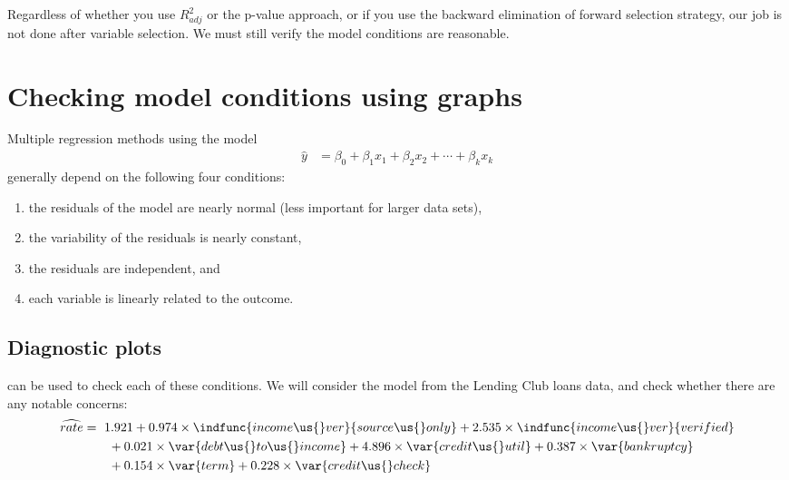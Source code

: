 Regardless of whether you use $R_{adj}^2$ or the p-value approach,
or if you use the backward elimination of forward selection
strategy, our job is not done after variable selection.
We must still verify the model conditions are reasonable.




\section{Checking model conditions using graphs}
\label{multipleRegressionModelAssumptions}


\noindent%
Multiple regression methods using the model
\begin{align*}
\hat{y} &= \beta_0 + \beta_1x_1 + \beta_2x_2 + \cdots + \beta_kx_k
\end{align*}
generally depend on the following four conditions:
\begin{enumerate}
\setlength{\itemsep}{0mm}
\item the residuals of the model are nearly normal
    (less important for larger data sets),
\item the variability of the residuals is nearly constant,
\item the residuals are independent, and
\item each variable is linearly related to the outcome.
\end{enumerate}


\subsection{Diagnostic plots}
\label{diagnostic_plots_subsection}

 can be used
to check each of these conditions.
We will consider the
model from the Lending Club loans data, and check whether
there are any notable concerns:
\begin{align*}
\widehat{rate} &= \ 1.921
    + 0.974 \times \indfunc{income\us{}ver}{source\us{}only}
    + 2.535 \times \indfunc{income\us{}ver}{verified} \\
  &\qquad
    + 0.021 \times \var{debt\us{}to\us{}income}
    + 4.896 \times \var{credit\us{}util}
    + 0.387 \times \var{bankruptcy} \\
  &\qquad
    + 0.154 \times \var{term}
    + 0.228 \times \var{credit\us{}check}
\end{align*}

